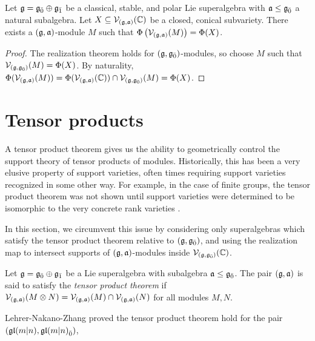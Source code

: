 \begin{proposition}
  Let $\mathfrak{g} = {\mathfrak{g}}_{\bar{0}} \oplus {\mathfrak{g}}_{\bar{1}}$ be a classical, stable, and polar Lie superalgebra with $\mathfrak{a} \leq {\mathfrak{g}}_{\bar{0}}$ a natural subalgebra. Let $X \subseteq \mathcal{V}_{(\mathfrak{g},\mathfrak{a})}(\mathbb{C})$ be a closed, conical subvariety. There exists a $(\mathfrak{g},\mathfrak{a})$-module $M$ such that $\Phi\left(\mathcal{V}_{(\mathfrak{g},\mathfrak{a})}(M)\right) = \Phi(X)$.
\end{proposition}
\begin{proof}
  The realization theorem holds for $(\mathfrak{g},{\mathfrak{g}}_{\bar{0}})$-modules, so choose $M$ such that $\mathcal{V}_{(\mathfrak{g},{\mathfrak{g}}_{\bar{0}})}(M) = \Phi(X)$. By naturality, $\Phi(\mathcal{V}_{(\mathfrak{g},\mathfrak{a})}(M)) = \Phi(\mathcal{V}_{(\mathfrak{g},\mathfrak{a})}(\mathbb{C})) \cap \mathcal{V}_{(\mathfrak{g},{\mathfrak{g}}_{\bar{0}})}(M) = \Phi(X)$.
\end{proof}

\section{Tensor products}
\label{sec:tensor-products}

A tensor product theorem gives us the ability to geometrically control the support theory of tensor products of modules. Historically, this has been a very elusive property of support varieties, often times requiring support varieties recognized in some other way. For example, in the case of finite groups, the tensor product theorem was not shown until support varieties were determined to be isomorphic to the very concrete rank varieties \cite{MR621284}.

In this section, we circumvent this issue by considering only superalgebras which satisfy the tensor product theorem relative to $(\mathfrak{g},{\mathfrak{g}}_{\bar{0}})$, and using the realization map to intersect supports of $(\mathfrak{g},\mathfrak{a})$-modules inside $\mathcal{V}_{(\mathfrak{g},{\mathfrak{g}}_{\bar{0}})}(\mathbb{C})$.

\begin{definition}
  Let $\mathfrak{g} = {\mathfrak{g}}_{\bar{0}} \oplus {\mathfrak{g}}_{\bar{1}}$ be a Lie superalgebra with subalgebra $\mathfrak{a} \leq {\mathfrak{g}}_{\bar{0}}$. The pair $(\mathfrak{g},\mathfrak{a})$ is said to satisfy the \emph{tensor product theorem} if $\mathcal{V}_{(\mathfrak{g},\mathfrak{a})}(M \otimes N) = \mathcal{V}_{(\mathfrak{g},\mathfrak{a})}(M) \cap \mathcal{V}_{(\mathfrak{g},\mathfrak{a})}(N)$ for all modules $M,N$.
\end{definition}

Lehrer-Nakano-Zhang proved the tensor product theorem hold for the pair $(\mathfrak{gl}(m|n),{\mathfrak{gl}(m|n)}_{\bar{0}})$, \cite[Theorem 5.2.1]{MR2836115}

